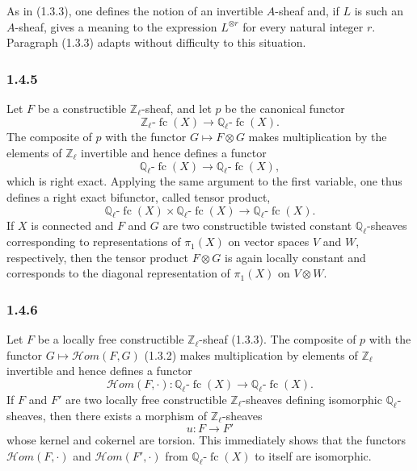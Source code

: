 \documentclass[11pt]{article}
\providecommand{\cHom}{\mathcal{H}om}
\providecommand{\fc}{\operatorname{fc}}
\begin{document}
As in (1.3.3), one defines the notion of an invertible \(A\)-sheaf and, if \(L\) is such an \(A\)-sheaf, gives a meaning to the expression \(L^{\otimes r}\) for every natural integer \(r\). Paragraph (1.3.3) adapts without difficulty to this situation.

\subsubsection*{1.4.5}
Let \(F\) be a constructible \(\mathbb Z_\ell\)-sheaf, and let \(p\) be the canonical functor
\[
\mathbb Z_\ell\text{-}\fc(X)\longrightarrow \mathbb Q_\ell\text{-}\fc(X).
\]
The composite of \(p\) with the functor \(G\mapsto F\otimes G\) makes multiplication by the elements of \(\mathbb Z_\ell\) invertible and hence defines a functor
\[
\mathbb Q_\ell\text{-}\fc(X)\longrightarrow \mathbb Q_\ell\text{-}\fc(X),
\]
which is right exact. Applying the same argument to the first variable, one thus defines a right exact bifunctor, called tensor product,
\[
\mathbb Q_\ell\text{-}\fc(X)\times \mathbb Q_\ell\text{-}\fc(X)
\longrightarrow \mathbb Q_\ell\text{-}\fc(X).
\]
If \(X\) is connected and \(F\) and \(G\) are two constructible twisted constant \(\mathbb Q_\ell\)-sheaves corresponding to representations of \(\pi_1(X)\) on vector spaces \(V\) and \(W\), respectively, then the tensor product \(F\otimes G\) is again locally constant and corresponds to the diagonal representation of \(\pi_1(X)\) on \(V\otimes W\).

\subsubsection*{1.4.6}
Let \(F\) be a locally free constructible \(\mathbb Z_\ell\)-sheaf (1.3.3). The composite of \(p\) with the functor \(G\mapsto\cHom(F,G)\) (1.3.2) makes multiplication by elements of \(\mathbb Z_\ell\) invertible and hence defines a functor
\[
\cHom(F,\cdot):\mathbb Q_\ell\text{-}\fc(X)\longrightarrow \mathbb Q_\ell\text{-}\fc(X).
\]
If \(F\) and \(F'\) are two locally free constructible \(\mathbb Z_\ell\)-sheaves defining isomorphic \(\mathbb Q_\ell\)-sheaves, then there exists a morphism of \(\mathbb Z_\ell\)-sheaves
\[
u:F\longrightarrow F'
\]
whose kernel and cokernel are torsion. This immediately shows that the functors \(\cHom(F,\cdot)\) and \(\cHom(F',\cdot)\) from \(\mathbb Q_\ell\text{-}\fc(X)\) to itself are isomorphic.
\end{document}
